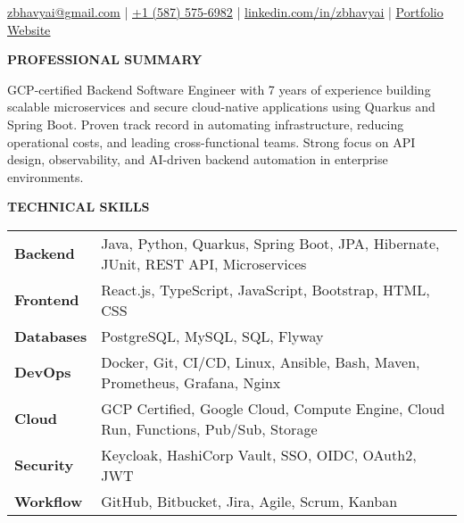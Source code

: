 \documentclass[a4paper]{article}
\newcommand{\header} [1] {
    \vspace{6pt}
    {\hspace*{-18pt} \textcolor{Accent}{\large\textbf{\MakeUppercase{#1}}}}
    \vspace{-7pt} \\
    {\color{Accent}\hspace*{-18pt} \hrulefill \hspace*{-7pt}}
}
\begin{document}
\begin{center}
   {}
\end{center}
\vspace{-10pt}

\begin{center}
    \href{mailto:zbhavyai@gmail.com}{\uline{zbhavyai@gmail.com}} \quad|\quad
    \href{tel:+15875756982}{\uline{+1 (587) 575-6982}} \quad|\quad
    \href{https://linkedin.com/in/zbhavyai}{\uline{linkedin.com/in/zbhavyai}} \quad|\quad
    \href{https://zbhavyai.github.io}{\uline{Portfolio Website}}
\end{center}


\header{Professional Summary}

\vspace{-8pt}
\begin{justify}
{\fontsize{9.0pt}{11pt}\selectfont GCP-certified Backend Software Engineer with 7 years of experience building scalable microservices and secure cloud-native applications using Quarkus and Spring Boot. Proven track record in automating infrastructure, reducing operational costs, and leading cross-functional teams. Strong focus on API design, observability, and AI-driven backend automation in enterprise environments.}
\end{justify}
\vspace{-4pt}


\header{Technical Skills}

\vspace{2pt}
{\fontsize{9.0pt}{11pt}\selectfont
\begin{tabular}{ l l }
    \textbf{Backend}    & Java, Python, Quarkus, Spring Boot, JPA, Hibernate, JUnit, REST API, Microservices    \\
    \textbf{Frontend}   & React.js, TypeScript, JavaScript, Bootstrap, HTML, CSS                                \\
    \textbf{Databases}  & PostgreSQL, MySQL, SQL, Flyway                                                        \\
    \textbf{DevOps}     & Docker, Git, CI/CD, Linux, Ansible, Bash, Maven, Prometheus, Grafana, Nginx           \\
    \textbf{Cloud}      & GCP Certified, Google Cloud, Compute Engine, Cloud Run, Functions, Pub/Sub, Storage   \\
    \textbf{Security}   & Keycloak, HashiCorp Vault, SSO, OIDC, OAuth2, JWT                                     \\
    \textbf{Workflow}   & GitHub, Bitbucket, Jira, Agile, Scrum, Kanban                                         \\
\end{tabular}
}
\end{document}
